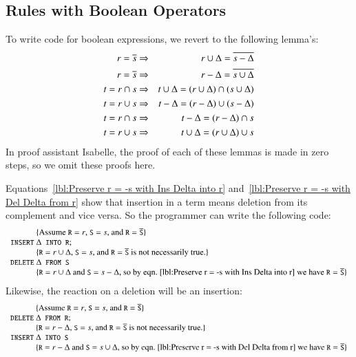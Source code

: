 \documentclass{elsarticle}
\begin{document}
\subsection{Rules with Boolean Operators}
	To write code for boolean expressions,
	we revert to the following lemma's:
\begin{eqnarray}
r=\overline{s}&\Rightarrow&r\cup\Delta=\overline{s-\Delta}\label{lbl:Preserve r = -s with Ins Delta into r}\\
r=\overline{s}&\Rightarrow&r-\Delta=\overline{s\cup\Delta}\label{lbl:Preserve r = -s with Del Delta from r}\\
t=r\cap s&\Rightarrow&t\cup\Delta=(r\cup\Delta)\cap(s\cup\Delta)\label{lbl:Preserve t=r inter s with Ins Delta into t}\\
t=r\cup s&\Rightarrow&t-\Delta=(r-\Delta)\cup(s-\Delta)\label{lbl:Preserve t=r union s with Del Delta from t}\\
t=r\cap s&\Rightarrow&t-\Delta=(r-\Delta)\cap s\label{lbl:Preserve t=r inter s with Del Delta from t}\\
t=r\cup s&\Rightarrow&t\cup\Delta=(r\cup\Delta)\cup s\label{lbl:Preserve t=r union s with Ins Delta into t}
\end{eqnarray}
	In proof assistant Isabelle, the proof of each of these lemmas is made in zero steps, so we omit these proofs here.

	Equations~\ref{lbl:Preserve r = -s with Ins Delta into r} and~\ref{lbl:Preserve r = -s with Del Delta from r}
	show that insertion in a term means deletion from its complement and vice versa.
	So the programmer can write the following code:
\[\begin{array}{r@{~}l}
&\{\text{Assume $\code{R}=r$, $\code{S}=s$, and $\code{R}=\cmpl{\code{S}}$}\}\\
\code{INSERT}&\Delta\code{ INTO R};\\
&\{\text{$\code{R}=r\cup\Delta$, $\code{S}=s$, and $\code{R}=\cmpl{\code{S}}$ is not necessarily true.}\}\\
\code{DELETE}&\Delta\code{ FROM S}\\
&\{\text{$\code{R}=r\cup\Delta$ and $\code{S}=s-\Delta$, so by eqn.~\ref{lbl:Preserve r = -s with Ins Delta into r} we have $\code{R}=\cmpl{\code{S}}$}\}
\end{array}\]
	Likewise, the reaction on a deletion will be an insertion:
\[\begin{array}{r@{~}l}
&\{\text{Assume $\code{R}=r$, $\code{S}=s$, and $\code{R}=\cmpl{\code{S}}$}\}\\
\code{DELETE}&\Delta\code{ FROM R};\\
&\{\text{$\code{R}=r-\Delta$, $\code{S}=s$, and $\code{R}=\cmpl{\code{S}}$ is not necessarily true.}\}\\
\code{INSERT}&\Delta\code{ INTO S}\\
&\{\code{R}=r-\Delta\text{ and }\code{S}=s\cup\Delta\text{, so by eqn.~\ref{lbl:Preserve r = -s with Del Delta from r} we have }\code{R}=\cmpl{\code{S}}\}
\end{array}\]
\end{document}
